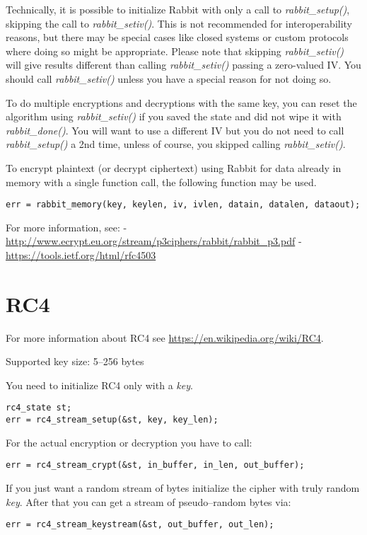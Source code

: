 \documentclass[synpaper]{book}
\newcommand{\mysection}[1]    %
	{                   %
	\section{#1}
   \markboth{\textsf{www.libtom.net}}{\thesection ~ {#1}}
	}
\begin{document}
Technically, it is possible to initialize Rabbit with only a call to \textit{rabbit\_setup()},
skipping the call to \textit{rabbit\_setiv()}.  This is not recommended for interoperability reasons,
but there may be special cases like closed systems or custom protocols where doing so might be
appropriate.  Please note that skipping \textit{rabbit\_setiv()} will give results different than
calling \textit{rabbit\_setiv()} passing a zero-valued IV.  You should call \textit{rabbit\_setiv()} unless
you have a special reason for not doing so.

To do multiple encryptions and decryptions with the same key, you can reset the algorithm
using \textit{rabbit\_setiv()} if you saved the state and did not wipe it with \textit{rabbit\_done()}.
You will want to use a different IV but you do not need to call \textit{rabbit\_setup()} a 2nd time,
unless of course, you skipped calling \textit{rabbit\_setiv()}.

To encrypt plaintext (or decrypt ciphertext) using Rabbit for data already in
memory with a single function call, the following function may be used.
\begin{verbatim}
err = rabbit_memory(key, keylen, iv, ivlen, datain, datalen, dataout);
\end{verbatim}

For more information, see: \newline
\hspace{4em}- \url{http://www.ecrypt.eu.org/stream/p3ciphers/rabbit/rabbit_p3.pdf} \newline
\hspace{4em}- \url{https://tools.ietf.org/html/rfc4503}

\mysection{RC4}

For more information about RC4 see \url{https://en.wikipedia.org/wiki/RC4}.

Supported key size: 5--256 bytes

You need to initialize RC4 only with a \textit{key}.
\begin{verbatim}
rc4_state st;
err = rc4_stream_setup(&st, key, key_len);
\end{verbatim}

For the actual encryption or decryption you have to call:
\begin{verbatim}
err = rc4_stream_crypt(&st, in_buffer, in_len, out_buffer);
\end{verbatim}


If you just want a random stream of bytes initialize the cipher with truly random \textit{key}.
After that you can get a stream of pseudo--random bytes via:
\begin{verbatim}
err = rc4_stream_keystream(&st, out_buffer, out_len);
\end{verbatim}
\end{document}
